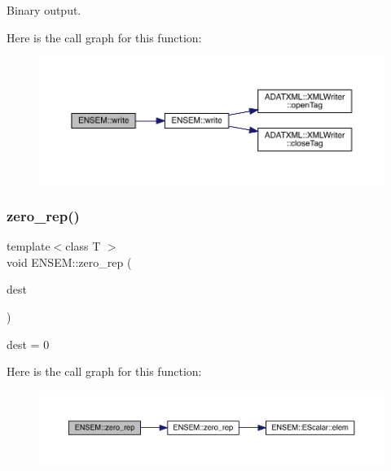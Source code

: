 Binary output. 

Here is the call graph for this function\+:\nopagebreak
\begin{figure}[H]
\begin{center}
\leavevmode
\includegraphics[width=350pt]{da/dc7/group__rcomplex_ga5087feb4530a8e07f00227de0852c625_cgraph}
\end{center}
\end{figure}
\mbox{\label{group__rcomplex_gaf64745e6e9f179738a187230acf6b2ea}} 
\subsubsection{\texorpdfstring{zero\_rep()}{zero\_rep()}}
{\footnotesize\ttfamily template$<$class T $>$ \\
void E\+N\+S\+E\+M\+::zero\+\_\+rep (\begin{DoxyParamCaption}\item[{\mbox{\hyperlink{classENSEM_1_1RComplex}{R\+Complex}}$<$ T $>$ \&}]{dest }\end{DoxyParamCaption})\hspace{0.3cm}{\ttfamily [inline]}}



dest = 0 

Here is the call graph for this function\+:\nopagebreak
\begin{figure}[H]
\begin{center}
\leavevmode
\includegraphics[width=350pt]{da/dc7/group__rcomplex_gaf64745e6e9f179738a187230acf6b2ea_cgraph}
\end{center}
\end{figure}


